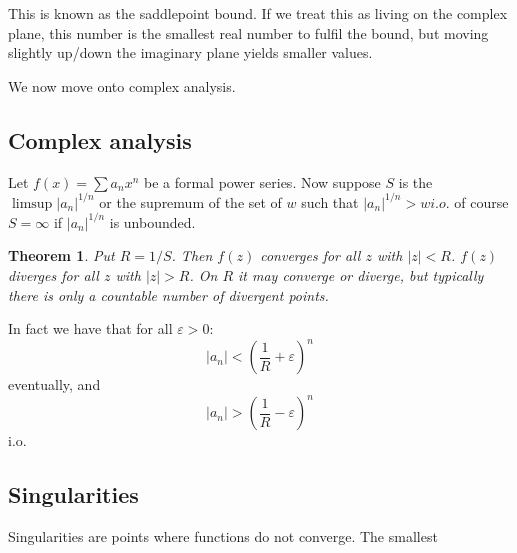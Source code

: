 \documentclass[]{article}
\newtheorem{theorem}{Theorem}
\theoremstyle{definition}
\numberwithin{theorem}{section}
\numberwithin{equation}{section}
\begin{document}
This is known as the saddlepoint bound. If we treat this as living on the complex plane, this number is the smallest real number to fulfil the bound, but moving slightly up/down the imaginary plane yields smaller values. 

We now move onto complex analysis.

\subsection{Complex analysis}
Let $f(x) = \sum a_n x^n$ be a formal power series. Now suppose $S$ is the $\limsup |a_n|^{1/n}$ or the supremum of the set of $w$ such that $|a_n|^{1/n} > w i.o$. 
of course $S = \infty$ if $|a_n|^{1/n}$ is unbounded.

\begin{theorem}
	Put $R = 1/S$. Then $f(z)$ converges for all $z$ with $|z| < R$. $f(z)$ diverges for all $z$ with $|z| > R$. On $R$ it may converge or diverge, but typically there is only a countable number of divergent points. 
\end{theorem}
In fact we have that for all $\varepsilon > 0$:
\begin{equation}
	|a_n | < (\frac{1}{R} + \varepsilon)^n 
\end{equation}
eventually, and 
\begin{equation}
	|a_n | > (\frac{1}{R} - \varepsilon)^n 
\end{equation}
i.o.

\subsection{Singularities}
Singularities are points where functions do not converge. The smallest 
\end{document}
